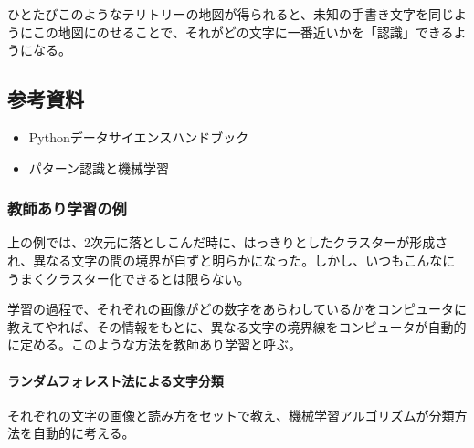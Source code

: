 \documentclass[11pt]{article}
\providecommand{\tightlist}{%
      \setlength{\itemsep}{0pt}\setlength{\parskip}{0pt}}
\begin{document}
    ひとたびこのようなテリトリーの地図が得られると、未知の手書き文字を同じようにこの地図にのせることで、それがどの文字に一番近いかを「認識」できるようになる。

    \subsection{参考資料}\label{ux53c2ux8003ux8cc7ux6599}

\begin{itemize}
\tightlist
\item
  Pythonデータサイエンスハンドブック
\item
  パターン認識と機械学習
\end{itemize}

    \subsubsection{教師あり学習の例}\label{ux6559ux5e2bux3042ux308aux5b66ux7fd2ux306eux4f8b}

上の例では、2次元に落としこんだ時に、はっきりとしたクラスターが形成され、異なる文字の間の境界が自ずと明らかになった。しかし、いつもこんなにうまくクラスター化できるとは限らない。

学習の過程で、それぞれの画像がどの数字をあらわしているかをコンピュータに教えてやれば、その情報をもとに、異なる文字の境界線をコンピュータが自動的に定める。このような方法を教師あり学習と呼ぶ。

    \paragraph{ランダムフォレスト法による文字分類}\label{ux30e9ux30f3ux30c0ux30e0ux30d5ux30a9ux30ecux30b9ux30c8ux6cd5ux306bux3088ux308bux6587ux5b57ux5206ux985e}

それぞれの文字の画像と読み方をセットで教え、機械学習アルゴリズムが分類方法を自動的に考える。
\end{document}
